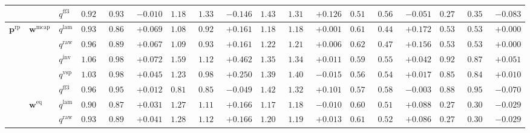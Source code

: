 \documentclass{article}
\begin{document}
\begin{table}[!htbp]
{\begin{tabular}{lll ccc ccc ccc ccc ccc}
 &  & $q^{\mathrm{ff3}}$ & $0.925$ & $0.935$ & \cellcolor{negred!50}$-0.010$ & $1.184$ & $1.330$ & \cellcolor{negred!50}$-0.146$ & $1.438$ & $1.312$ & \cellcolor{posgreen!50}$+0.126$ & $0.511$ & $0.562$ & \cellcolor{negred!50}$-0.051$ & $0.271$ & $0.354$ & \cellcolor{negred!50}$-0.083$ \\
\midrule
$\mathbf{p}^{\mathrm{rp}}$ & $\mathbf{w}^{\mathrm{mcap}}$ & $q^{\mathrm{lam}}$ & $0.935$ & $0.865$ & \cellcolor{posgreen!50}$+0.069$ & $1.088$ & $0.926$ & \cellcolor{posgreen!50}$+0.161$ & $1.186$ & $1.185$ & \cellcolor{posgreen!50}$+0.001$ & $0.619$ & $0.447$ & \cellcolor{posgreen!50}$+0.172$ & $0.534$ & $0.534$ & $+0.000$ \\
 &  & $q^{\mathrm{raw}}$ & $0.960$ & $0.893$ & \cellcolor{posgreen!50}$+0.067$ & $1.092$ & $0.931$ & \cellcolor{posgreen!50}$+0.161$ & $1.222$ & $1.216$ & \cellcolor{posgreen!50}$+0.006$ & $0.626$ & $0.471$ & \cellcolor{posgreen!50}$+0.156$ & $0.534$ & $0.534$ & $+0.000$ \\
 &  & $q^{\mathrm{inv}}$ & $1.061$ & $0.989$ & \cellcolor{posgreen!50}$+0.072$ & $1.590$ & $1.127$ & \cellcolor{posgreen!50}$+0.462$ & $1.353$ & $1.342$ & \cellcolor{posgreen!50}$+0.011$ & $0.593$ & $0.551$ & \cellcolor{posgreen!50}$+0.042$ & $0.929$ & $0.878$ & \cellcolor{posgreen!50}$+0.051$ \\
 &  & $q^{\mathrm{vsp}}$ & $1.030$ & $0.985$ & \cellcolor{posgreen!50}$+0.045$ & $1.233$ & $0.983$ & \cellcolor{posgreen!50}$+0.250$ & $1.394$ & $1.409$ & \cellcolor{negred!50}$-0.015$ & $0.560$ & $0.543$ & \cellcolor{posgreen!50}$+0.017$ & $0.851$ & $0.841$ & \cellcolor{posgreen!50}$+0.010$ \\
 &  & $q^{\mathrm{ff3}}$ & $0.969$ & $0.957$ & \cellcolor{posgreen!50}$+0.012$ & $0.810$ & $0.859$ & \cellcolor{negred!50}$-0.049$ & $1.421$ & $1.320$ & \cellcolor{posgreen!50}$+0.101$ & $0.577$ & $0.580$ & \cellcolor{negred!50}$-0.003$ & $0.883$ & $0.953$ & \cellcolor{negred!50}$-0.070$ \\
\cmidrule(lr){2-18}
 & $\mathbf{w}^{\mathrm{eq}}$ & $q^{\mathrm{lam}}$ & $0.906$ & $0.875$ & \cellcolor{posgreen!50}$+0.031$ & $1.277$ & $1.112$ & \cellcolor{posgreen!50}$+0.166$ & $1.171$ & $1.181$ & \cellcolor{negred!50}$-0.010$ & $0.603$ & $0.515$ & \cellcolor{posgreen!50}$+0.088$ & $0.274$ & $0.303$ & \cellcolor{negred!50}$-0.029$ \\
 &  & $q^{\mathrm{raw}}$ & $0.933$ & $0.892$ & \cellcolor{posgreen!50}$+0.041$ & $1.289$ & $1.123$ & \cellcolor{posgreen!50}$+0.166$ & $1.207$ & $1.194$ & \cellcolor{posgreen!50}$+0.013$ & $0.613$ & $0.527$ & \cellcolor{posgreen!50}$+0.086$ & $0.274$ & $0.303$ & \cellcolor{negred!50}$-0.029$ \\

\end{tabular}}
\end{table}
\end{document}
